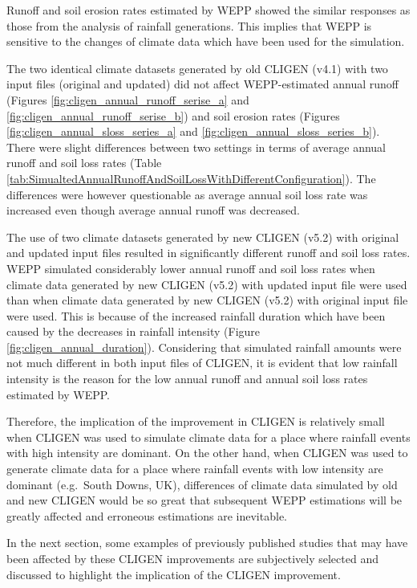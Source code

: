 Runoff and soil erosion rates estimated by WEPP showed the similar responses as
those from the analysis of rainfall generations. This implies that WEPP is
sensitive to the changes of climate data which have been used for the
simulation.

The two identical climate datasets generated by old CLIGEN (v4.1) with two input
files (original and updated) did not affect WEPP-estimated annual runoff
(Figures \ref{fig:cligen_annual_runoff_serise_a} and
\ref{fig:cligen_annual_runoff_serise_b}) and soil erosion rates (Figures
\ref{fig:cligen_annual_sloss_series_a} and
\ref{fig:cligen_annual_sloss_series_b}).
There were slight differences between two settings in terms of average annual
runoff and soil loss rates (Table
\ref{tab:SimualtedAnnualRunoffAndSoilLossWithDifferentConfiguration}). The
differences were however questionable as average annual soil loss rate was
increased even though average annual runoff was decreased.

The use of two climate datasets generated by new CLIGEN (v5.2) with original and
updated input files resulted in significantly different runoff and soil loss
rates. WEPP simulated considerably lower annual runoff and soil loss rates when
climate data generated by new CLIGEN (v5.2) with updated input file were used
than when climate data generated by new CLIGEN (v5.2) with original input file
were used. This is because of the increased rainfall duration which have
been caused by the decreases in rainfall intensity (Figure
\ref{fig:cligen_annual_duration}). Considering that simulated rainfall amounts
were not much different in both input files of CLIGEN, it is evident that low
rainfall intensity is the reason for the low annual runoff and annual soil loss
rates estimated by WEPP.

Therefore, the implication of the improvement in CLIGEN is relatively small when
CLIGEN was used to simulate climate data for a place where rainfall events
with high intensity are dominant. On the other hand, when CLIGEN was used
to generate climate data for a place where rainfall events with low intensity
are dominant (e.g.\ South Downs, UK), differences of climate data simulated by
old and new CLIGEN would be so great that subsequent WEPP estimations will be
greatly affected and erroneous estimations are inevitable.

In the next section, some examples of previously published studies that may have
been affected by these CLIGEN improvements are subjectively selected and
discussed to highlight the implication of the CLIGEN improvement.

